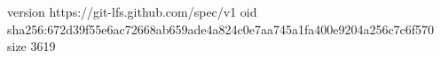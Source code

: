 version https://git-lfs.github.com/spec/v1
oid sha256:672d39f55e6ac72668ab659ade4a824c0e7aa745a1fa400e9204a256c7c6f570
size 3619
